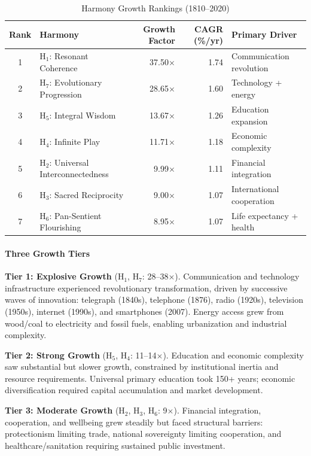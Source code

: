 \documentclass[11pt]{article}
\begin{document}
\begin{table}[h]
\centering
\caption{Harmony Growth Rankings (1810--2020)}
\label{tab:harmony-growth-rankings}
\begin{tabular}{clrrl}
\toprule
\textbf{Rank} & \textbf{Harmony} & \textbf{Growth Factor} & \textbf{CAGR (\%/yr)} & \textbf{Primary Driver} \\
\midrule
1 & H$_1$: Resonant Coherence & 37.50$\times$ & 1.74 & Communication revolution \\
2 & H$_7$: Evolutionary Progression & 28.65$\times$ & 1.60 & Technology + energy \\
3 & H$_5$: Integral Wisdom & 13.67$\times$ & 1.26 & Education expansion \\
4 & H$_4$: Infinite Play & 11.71$\times$ & 1.18 & Economic complexity \\
5 & H$_2$: Universal Interconnectedness & 9.99$\times$ & 1.11 & Financial integration \\
6 & H$_3$: Sacred Reciprocity & 9.00$\times$ & 1.07 & International cooperation \\
7 & H$_6$: Pan-Sentient Flourishing & 8.95$\times$ & 1.07 & Life expectancy + health \\
\bottomrule
\end{tabular}
\end{table}

\paragraph{Three Growth Tiers}

\textbf{Tier 1: Explosive Growth} (H$_1$, H$_7$: 28--38$\times$). Communication
and technology infrastructure experienced revolutionary transformation, driven by
successive waves of innovation: telegraph (1840s), telephone (1876), radio
(1920s), television (1950s), internet (1990s), and smartphones (2007). Energy
access grew from wood/coal to electricity and fossil fuels, enabling
urbanization and industrial complexity.

\textbf{Tier 2: Strong Growth} (H$_5$, H$_4$: 11--14$\times$). Education and
economic complexity saw substantial but slower growth, constrained by
institutional inertia and resource requirements. Universal primary education
took 150+ years; economic diversification required capital accumulation and
market development.

\textbf{Tier 3: Moderate Growth} (H$_2$, H$_3$, H$_6$: 9$\times$). Financial
integration, cooperation, and wellbeing grew steadily but faced structural
barriers: protectionism limiting trade, national sovereignty limiting
cooperation, and healthcare/sanitation requiring sustained public investment.
\end{document}
